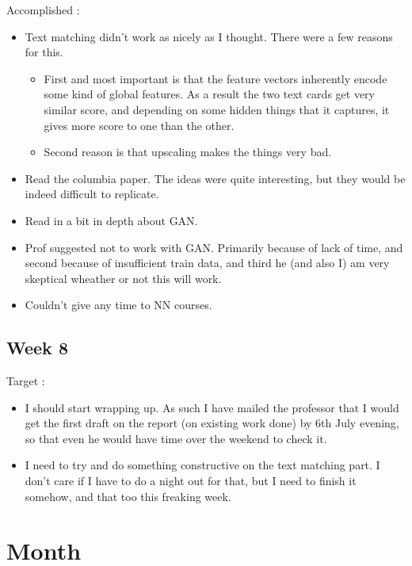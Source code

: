 \documentclass{article}
\begin{document}
Accomplished :
\begin{itemize}
\item Text matching didn't work as nicely as I thought. There were a few reasons for this.
  \begin{itemize}
  \item First and most important is that the feature vectors inherently encode some kind of global features. As a result the two text cards get very similar score, and depending on some hidden things that it captures, it gives more score to one than the other.
  \item Second reason is that upscaling makes the things very bad.
  \end{itemize}
\item Read the columbia paper. The ideas were quite interesting, but they would be indeed difficult to replicate.
\item Read in a bit in depth about GAN.
\item Prof suggested not to work with GAN. Primarily because of lack of time, and second because of insufficient train data, and third he (and also I) am very skeptical wheather or not this will work.
\item Couldn't give any time to NN courses.
\end{itemize}

\subsection{Week 8}
Target :
\begin{itemize}
\item I should start wrapping up. As such I have mailed the professor that I would get the first draft on the report (on existing work done) by 6th July evening, so that even he would have time over the weekend to check it.
\item I need to try and do something constructive on the text matching part. I don't care if I have to do a night out for that, but I need to finish it somehow, and that too this freaking week.
\end{itemize}

\section{Month}
\end{document}
